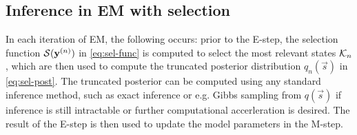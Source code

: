 

\subsection{Inference in EM with selection}
%
In each iteration of EM, the following occurs: 
prior to the E-step, the selection function $\mathcal{S}({\mathbf{y}}^{(n)})$ in \eqref{eq:sel-func} is computed to select the most relevant states $\mathcal{K}_{n}$, 
which are then used to compute the truncated posterior distribution $q_n(\vec{s})$ in \eqref{eq:sel-post}.
The truncated posterior can be computed using any standard inference method, 
such as exact inference or e.g. Gibbs sampling from $q(\vec{s})$  %
if inference is still intractable or further computational accerleration is desired.
The result of the E-step is then used to update the model parameters  in the M-step. 



